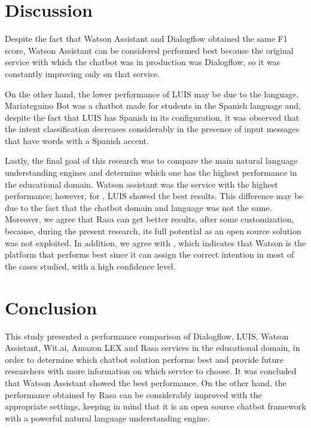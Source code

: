 \documentclass[conference]{IEEEtran}
\begin{document}
\section{Discussion}

Despite the fact that Watson Assistant and Dialogflow obtained the same F1 score, Watson Assistant can be considered performed best because the original service with which the chatbot was in production was Dialogflow, so it was constantly improving only on that service.

On the other hand, the lower performance of LUIS may be due to the language. Mariateguino Bot was a chatbot made for students in the Spanish language and, despite the fact that LUIS has Spanish in its configuration, it was observed that the intent classification decreases considerably in the presence of input messages that have words with a Spanish accent.

Lastly, the final goal of this research was to compare the main natural language understanding engines and determine which one has the highest performance in the educational domain. Watson assistant was the service with the highest performance; however, for \cite{Braun2017}, LUIS showed the best results. This difference may be due to the fact that the chatbot domain and language was not the same. Moreover, we agree that Rasa can get better results, after some customization, because, during the present research, its full potential as an open source solution was not exploited. In addition, we agree with \cite{Canonico2018}, which indicates that Watson is the platform that performs best since it can assign the correct intention in most of the cases studied, with a high confidence level.

\section{Conclusion}

This study presented a performance comparison of Dialogflow, LUIS, Watson Assistant, Wit.ai, Amazon LEX and Rasa  services in the educational domain, in order to determine which chatbot solution performs best and provide future researchers with more information on which service to choose. It was concluded that Watson Assistant showed the best performance. On the other hand, the performance obtained by Rasa can be considerably improved with the appropriate settings, keeping in mind that it is an open source chatbot framework with a powerful natural language understanding engine.
\end{document}
